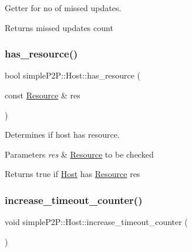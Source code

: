 Getter for no of missed updates. 

\begin{DoxyReturn}{Returns}
missed updates count 
\end{DoxyReturn}
\mbox{\label{classsimpleP2P_1_1Host_a242f1e472007f5b52bfdfbe74a47009f}} 
\subsubsection{\texorpdfstring{has\+\_\+resource()}{has\_resource()}}
{\footnotesize\ttfamily bool simple\+P2\+P\+::\+Host\+::has\+\_\+resource (\begin{DoxyParamCaption}\item[{const \hyperlink{classsimpleP2P_1_1Resource}{Resource} \&}]{res }\end{DoxyParamCaption})}



Determines if host has resource. 


\begin{DoxyParams}{Parameters}
{\em res} & \hyperlink{classsimpleP2P_1_1Resource}{Resource} to be checked \\
\hline
\end{DoxyParams}
\begin{DoxyReturn}{Returns}
true if \hyperlink{classsimpleP2P_1_1Host}{Host} has \hyperlink{classsimpleP2P_1_1Resource}{Resource} res 
\end{DoxyReturn}
\mbox{\label{classsimpleP2P_1_1Host_afcd858f4c6a7496b6164e36a5192f1db}} 
\subsubsection{\texorpdfstring{increase\+\_\+timeout\+\_\+counter()}{increase\_timeout\_counter()}}
{\footnotesize\ttfamily void simple\+P2\+P\+::\+Host\+::increase\+\_\+timeout\+\_\+counter (\begin{DoxyParamCaption}{ }\end{DoxyParamCaption})}



